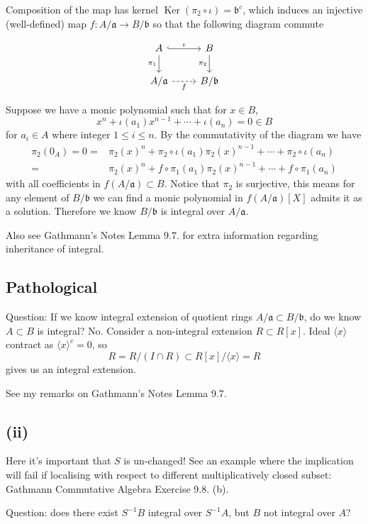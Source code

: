 Composition of the map has kernel $\operatorname{Ker}(\pi_2\circ\iota)= \mathfrak b^c$, which induces an injective (well-defined) map $f:A/\mathfrak a\to B/\mathfrak b$ so that the following diagram commute

\[\begin{tikzcd}
	A & B \\
	{A/\mathfrak a} & {B/\mathfrak b}
	\arrow["{\pi_1}"', from=1-1, to=2-1]
	\arrow["{\pi_2}"', from=1-2, to=2-2]
	\arrow["\iota", hook, from=1-1, to=1-2]
	\arrow["f"', dashed, from=2-1, to=2-2]
\end{tikzcd}\]

Suppose we have a monic polynomial such that for $x\in B$,
\[x^n+\iota(a_1)x^{n-1}+\cdots+\iota(a_n)=0\in B\] for $a_i\in A$ where integer $1\leq i\leq n$. By the commutativity of the diagram we have 
\begin{align*}
    \pi_2(0_A)=0=&\pi_2(x)^n+\pi_2\circ\iota(a_1)\pi_2(x)^{n-1}+\cdots+\pi_2\circ\iota(a_n)\\
    =&\pi_2(x)^n+f\circ\pi_1(a_1)\pi_2(x)^{n-1}+\cdots+f\circ\pi_1(a_n)
\end{align*}with all coefficients in $f(A/\mathfrak a)\subset B$. Notice that $\pi_2$ is surjective, this means for any element of $B/\mathfrak b$ we can find a monic polynomial in $f(A/\mathfrak a)[X]$ admits it as a solution. Therefore we know $B/\mathfrak b$ is integral over $A/\mathfrak a$.

Also see Gathmann's Notes Lemma 9.7. for extra information regarding inheritance of integral.

\subsection{Pathological}

Question: If we know integral extension of quotient rings $A/\mathfrak a\subset B/\mathfrak b$, do we know $A\subset B$ is integral? No. Consider a non-integral extension $R\subset R[x]$. Ideal $\langle x\rangle$ contract as $\langle x\rangle^c=0$, so 
\[R=R/(I\cap R)\subset R[x]/\langle x\rangle=R\] gives us an integral extension.

See my remarks on Gathmann's Notes Lemma 9.7.

\subsection{(ii)}

Here it's important that $S$ is un-changed! See an example where the implication will fail if localising with respect to different multiplicatively closed subset: Gathmann Commutative Algebra Exercise 9.8. (b).

Question: does there exist $S^{-1}B$ integral over $S^{-1}A$, but $B$ not integral over $A$?